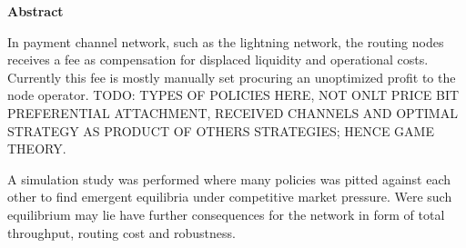 \centering \textbf{Abstract}

\iffalse
    In camera pre-calibration, images of a calibration object are commonly 
    used to determine the internal geometry of a camera.
    The calibration imaging is often optimized to have the calibration object 
    cover as large image area as possible.
    This is likely to yield a larger concentration
    of measured image points near the center of the image sensor.
    In this report, the hypothesis is investigated that this 
    non-uniform image point distribution results in a sub-optimal calibration.
    An area-based re-weighting scheme is suggested to improve the calibration.
    Additionally, the effect of a choice between a 2D and a 3D calibration
    object is investigated.
    
    A simulation study was performed where both a standard and area-weighted
    pre-calibration scheme was used in a parallel and a convergent scene.
    The estimated uncertainty and true errors were computed
    and compared to the first order predictions and results of perfect calibrations.
    The area-based calibration showed no reduction in estimation errors.
    Furthermore, the 3D calibration object did not give a noticeable improvement.
    However, for the standard and area-based calibrations, the true errors
    surpassed the estimated uncertainties by up to
    26 and 58 percent, respectively.
\fi

	In payment channel network, such as the lightning network, the routing
	nodes receives a fee as compensation for displaced liquidity and operational
	costs. Currently this fee is mostly manually set procuring an unoptimized profit to
	the node operator. TODO: TYPES OF POLICIES HERE, NOT ONLT PRICE BIT PREFERENTIAL ATTACHMENT, RECEIVED CHANNELS
	AND OPTIMAL STRATEGY AS PRODUCT OF OTHERS STRATEGIES; HENCE GAME THEORY. 
	
	A simulation study was performed where many policies was pitted against 
	each other to find emergent equilibria under competitive market pressure. Were such
	equilibrium may lie have further consequences for the network in form
	of total throughput, routing cost and robustness.
		 
	
	